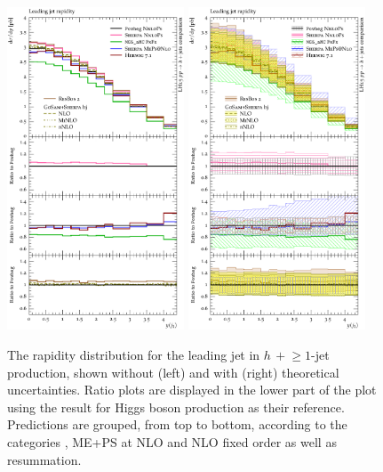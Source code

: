 \begin{figure}[t!]
  \centering
  \includegraphics[width=0.47\textwidth]{figures/hjetscomp_u_jet1_y.pdf}
  \hfill
  \includegraphics[width=0.47\textwidth]{figures/hjetscomp_jet1_y.pdf}
  \caption{\label{fig:hjetscomp:results:1obs:j1y}%
    The rapidity distribution for the leading jet in $h\,+\!\ge\!1$-jet
    production, shown without (left) and with (right) theoretical
    uncertainties. Ratio plots are displayed in the lower part of the
    plot using the \Powheg \NNLOPS result for Higgs boson production
    as their reference. Predictions are grouped, from top to bottom,
    according to the categories \NNLOPS, ME+PS at NLO and NLO fixed
    order as well as resummation.}
\end{figure}

